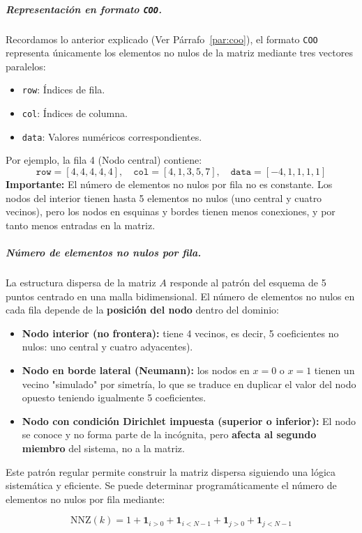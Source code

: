 \documentclass{article}
\begin{document}
\subparagraph{Representación en formato \texttt{COO}.} Recordamos lo anterior explicado (Ver Párrafo~\ref{par:coo}), el formato \texttt{COO} representa únicamente los elementos no nulos de la matriz mediante tres vectores paralelos:
\begin{itemize}
    \item \texttt{row}: Índices de fila.
    \item \texttt{col}: Índices de columna.
    \item \texttt{data}: Valores numéricos correspondientes.
\end{itemize}
Por ejemplo, la fila 4 (Nodo central) contiene:
$$
\texttt{row} = [4, 4, 4, 4, 4], \quad
\texttt{col} = [4, 1, 3, 5, 7], \quad
\texttt{data} = [-4, 1, 1, 1, 1]
$$
\textbf{Importante:} El número de elementos no nulos por fila no es constante. Los nodos del interior tienen hasta 5 elementos no nulos (uno central y cuatro vecinos), pero los nodos en esquinas y bordes tienen menos conexiones, y por tanto menos entradas en la matriz.

\subparagraph{Número de elementos no nulos por fila.}
\label{par:nnz2}
La estructura dispersa de la matriz \( A \) responde al patrón del esquema de 5 puntos centrado en una malla bidimensional. El número de elementos no nulos en cada fila depende de la \textbf{posición del nodo} dentro del dominio:

\begin{itemize}
    \item \textbf{Nodo interior (no frontera):} tiene 4 vecinos, es decir, 5 coeficientes no nulos: uno central y cuatro adyacentes).
    \item \textbf{Nodo en borde lateral (Neumann):} los nodos en \(x=0\) o \(x=1\) tienen un vecino "simulado" por simetría, lo que se traduce en duplicar el valor del nodo opuesto teniendo igualmente 5 coeficientes.
    \item \textbf{Nodo con condición Dirichlet impuesta (superior o inferior):} El nodo se conoce y no forma parte de la incógnita, pero \textbf{afecta al segundo miembro} del sistema, no a la matriz.
\end{itemize}

Este patrón regular permite construir la matriz dispersa siguiendo una lógica sistemática y eficiente. Se puede determinar programáticamente el número de elementos no nulos por fila mediante:

$$
\text{NNZ}(k) = 1 + \mathbf{1}_{i > 0} + \mathbf{1}_{i < N - 1} + \mathbf{1}_{j > 0} + \mathbf{1}_{j < N - 1}
$$
\end{document}
